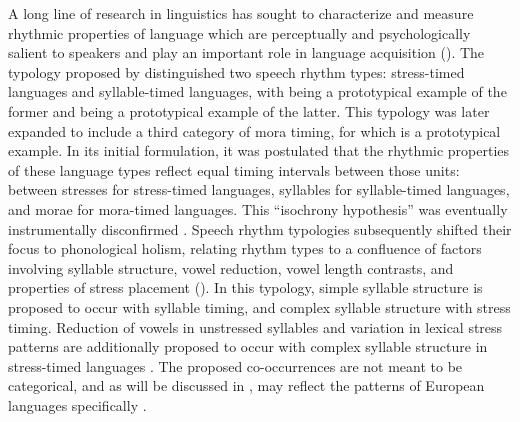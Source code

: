   A long line of research in linguistics has sought to characterize and measure rhythmic properties of language which are perceptually and psychologically sa\-lient to speakers and play an important role in language acquisition (\citealt{CutlerMehler1993}). The typology proposed by \citet{Pike1945} distinguished two speech rhythm types: stress-timed languages and syllable-timed languages, with  being a prototypical example of the former and  being a prototypical example of the latter. This typology was later expanded to include a third category of mora timing, for which  is a prototypical example. In its initial formulation, it was postulated that the rhythmic properties of these language types reflect equal timing intervals between those units: between stresses for stress-timed languages, syllables for syllable-timed languages, and morae for mora-timed languages. This ``isochrony hypothesis'' was eventually instrumentally disconfirmed \citep{Roach1982}. Speech rhythm typologies subsequently shifted their  focus to phonological holism, relating rhythm types to a confluence of factors involving syllable structure, vowel reduction, vowel length contrasts, and properties of stress placement (\citealt{Roach1982,Dauer1983}). In this typology, simple syllable structure is proposed to occur with syllable timing, and complex syllable structure with stress timing. Reduction of vowels in unstressed syllables and variation in lexical stress patterns are additionally proposed to occur with complex syllable structure in stress-timed languages \citep{Auer1993}. The proposed co-occurrences are not meant to be categorical, and as will be discussed in , may reflect the patterns of European languages specifically \citep{Schiering2007}.

